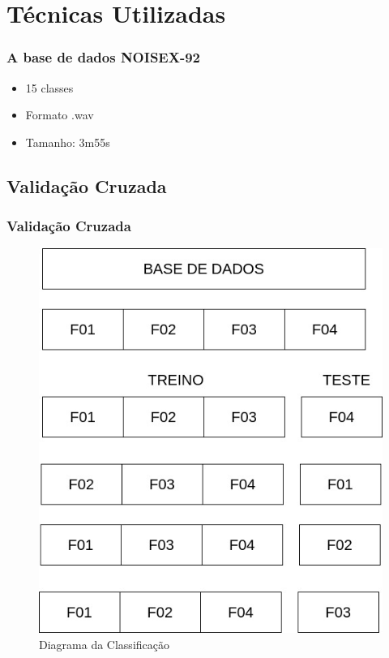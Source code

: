 \documentclass{beamer}
\begin{document}
\section{Técnicas Utilizadas}

\begin{frame}
    \frametitle{A base de dados NOISEX-92}
    
    \begin{itemize}
    	\setlength\itemsep{1em}
        \item 15 classes
    	\item Formato .wav
        \item Tamanho: 3m55s
	\end{itemize}
    
    \begin{table}[ht]
	\centering
	\caption{Classes na base de dados NOISEX.}
	\label{tab:noisex}
\end{table}
    
    
\end{frame}

\subsection{Validação Cruzada}

\begin{frame}
	\frametitle{Validação Cruzada}
	
	\begin{figure}[ht]
    	\centering
		\includegraphics[width=.4\textwidth]{crossvalid.jpg}
		\caption{Diagrama da Classificação}
		\label{fig:diagclass}
	\end{figure}
    
\end{frame}
\end{document}
